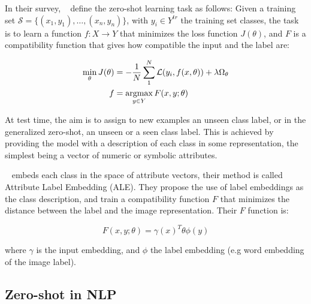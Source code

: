In their survey, ~\citet{xian2017zero} define the zero-shot learning task as follows: Given a training set $\mathcal{S} = \{(x_1, y_1), \dots, (x_n, y_n)\}$, with $y_i \in Y^{tr}$ the training set classes, the task is to learn a function $f: X \rightarrow Y$ that minimizes the loss function $J(\theta)$, and $F$ is a compatibility function that gives how compatible the input and the label are: 

\begin{equation}
\begin{split}
    \min_{\theta} J(\theta) & = - \frac{1}{N} \sum_{1}^{N} \mathcal{L}(y_i, f(x, \theta)) + \lambda \Omega_\theta \\
    f & = \operatorname*{argmax}_{y \in Y} F(x, y; \theta)
\end{split}
\end{equation}

At test time, the aim is to assign to new examples an unseen class label, or in the generalized zero-shot, an unseen or a seen class label. This is achieved by providing the model with a description of each class in some representation, the simplest being a vector of numeric or symbolic attributes.

~\cite{akata2015ale} embeds each class in the space of attribute vectors, their method is called Attribute Label Embedding (ALE). They propose the use of label embeddings as the class description, and train a compatibility function $F$ that minimizes the distance between the label and the image representation. Their $F$ function is:

\begin{equation}
F(x, y ; \theta)=\gamma(x)^{T} \theta \phi(y)
\end{equation}

where $\gamma$ is the input embedding, and $\phi$ the label embedding (e.g word embedding of the image label). 


\newpage
\subsection{Zero-shot in NLP}
